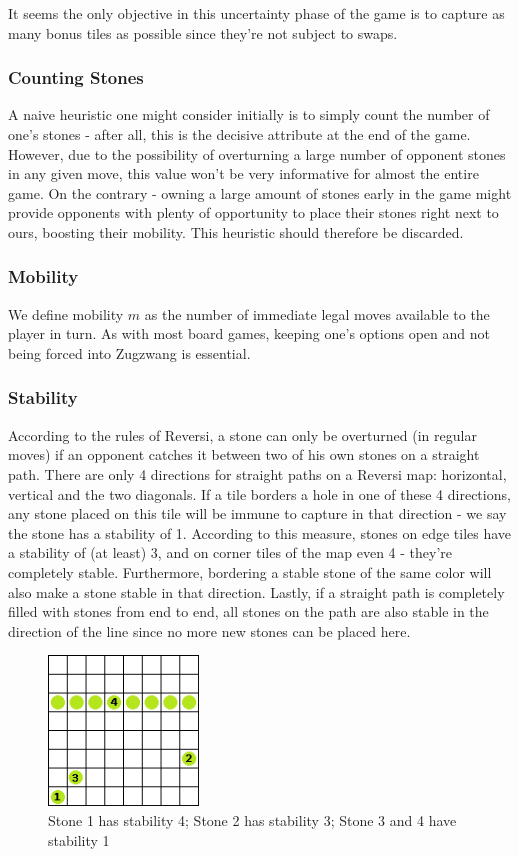 \documentclass[a4paper,12pt]{article}
\begin{document}
It seems the only objective in this uncertainty phase of the game is to capture as many bonus tiles as possible since they're not subject to swaps.


\subsubsection{Counting Stones}
A naive heuristic one might consider initially is to simply count the number of one's stones - after all, this is the decisive attribute at the end of the game. However, due to the possibility of overturning a large number of opponent stones in any given move, this value won't be very informative for almost the entire game. On the contrary - owning a large amount of stones early in the game might provide opponents with plenty of opportunity to place their stones right next to ours, boosting their mobility. This heuristic should therefore be discarded.

 
\subsubsection{Mobility}
We define mobility $m$ as the number of immediate legal moves available to the player in turn. As with most board games, keeping one's options open and not being forced into Zugzwang is essential. 

 
\subsubsection{Stability}
According to the rules of Reversi, a stone can only be overturned (in regular moves) if an opponent catches it between two of his own stones on a straight path. There are only 4 directions for straight paths on a Reversi map: horizontal, vertical and the two diagonals. If a tile borders a hole in one of these 4 directions, any stone placed on this tile will be immune to capture in that direction - we say the stone has a stability of 1. According to this measure, stones on edge tiles have a stability of (at least) 3, and on corner tiles of the map even 4 - they're completely stable. Furthermore, bordering a stable stone of the same color will also make a stone stable in that direction. Lastly, if a straight path is completely filled with stones from end to end, all stones on the path are also stable in the direction of the line since no more new stones can be placed here.

\begin{figure}[H]
    \centering
    \includegraphics[height=4cm]{pictures/assignment1/Stability.png}
    \caption{Stone 1 has stability 4; Stone 2 has stability 3; Stone 3 and 4 have stability 1}
    \label{fig:Stability}
\end{figure}
\end{document}

